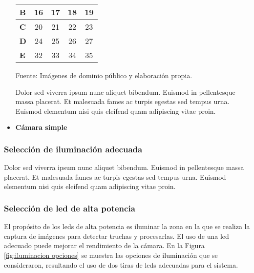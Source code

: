 \begin{itemize}
\begin{mytable}[H]
\begin{tabular}{l|c|c|c|c|}
			\multicolumn{1}{|l|}{\textbf{B}}          & 16                                                                    & 17         & 18         & 19         \\ \hline
			\multicolumn{1}{|l|}{\textbf{C}}          & 20                                                                    & 21         & 22         & 23         \\ \hline
			\multicolumn{1}{|l|}{\textbf{D}}          & 24                                                                    & 25         & 26         & 27         \\ \hline
			\multicolumn{1}{|l|}{\textbf{E}}          & 32                                                                    & 33         & 34         & 35         \\ \hline
		\end{tabular}
		\begin{flushleft}	
			Fuente: Imágenes de dominio público y elaboración propia.
		\end{flushleft}
	\end{mytable}
	
	Dolor sed viverra ipsum nunc aliquet bibendum. Euismod in pellentesque massa placerat. Et malesuada fames ac turpis egestas sed tempus urna. Euismod elementum nisi quis eleifend quam adipiscing vitae proin.
	
	\item \textbf{Cámara simple}
\end{itemize}



\subsubsection{Selección de iluminación adecuada} 


Dolor sed viverra ipsum nunc aliquet bibendum. Euismod in pellentesque massa placerat. Et malesuada fames ac turpis egestas sed tempus urna. Euismod elementum nisi quis eleifend quam adipiscing vitae proin.

\subsubsection{Selección de led de alta potencia}

El propósito de los leds de alta potencia es iluminar la zona en la que se realiza la captura de imágenes para detectar truchas y procesarlas. El uso de una led adecuado puede mejorar el rendimiento de la cámara. En la Figura \ref{fig:iluminacion opciones} se muestra las opciones de iluminación que se consideraron, resultando el uso de dos tiras de leds adecuadas para el sistema.

